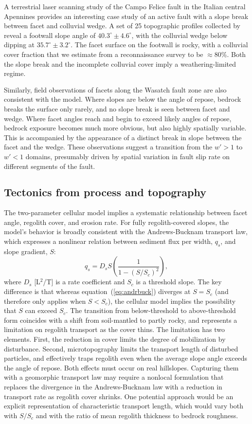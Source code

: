 A terrestrial laser scanning study of the Campo Felice fault in the Italian central Apennines provides an interesting case study of an active fault with a slope break between facet and colluvial wedge. A set of 25 topographic profiles collected by \citet{wilkinson2015slip} reveal a footwall slope angle of $40.3^\circ\pm 4.6^\circ$, with the colluvial wedge below dipping at $35.7^\circ\pm3.2^\circ$. The facet surface on the footwall is rocky, with a colluvial cover fraction that we estimate from a reconnaissance survey to be $\approx 80$\%. Both the slope break and the incomplete colluvial cover imply a weathering-limited regime. 

Similarly, field observations of facets along the Wasatch fault zone are also consistent with the model. Where slopes are below the angle of repose, bedrock breaks the surface only rarely, and no slope break is seen between facet and wedge. Where facet angles reach and begin to exceed likely angles of repose, bedrock exposure becomes much more obvious, but also highly spatially variable. This is accompanied by the appearance of a distinct break in slope between the facet and the wedge. These observations suggest a transition from the $w' > 1$ to $w' < 1$ domains, presumably driven by spatial variation in fault slip rate on different segments of the fault.

\subsection{Tectonics from process and topography}

The two-parameter cellular model implies a systematic relationship between facet angle, regolith cover, and erosion rate. For fully regolith-covered slopes, the model's behavior is broadly consistent with the Andrews-Bucknam transport law, which expresses a nonlinear relation between sediment flux per width, $q_s$, and slope gradient, $S$:
\begin{equation}
q_s = D_s S \left( \frac{1}{1-(S/S_c)^2} \right),
\label{eq:andrbuck}
\end{equation}
where $D_s$ [L$^2$/T] is a rate coefficient and $S_c$ is a threshold slope. The key difference is that whereas equation~(\ref{eq:andrbuck}) diverges at $S=S_c$ (and therefore only applies when $S<S_c$), the cellular model implies the possibility that $S$ can exceed $S_c$. The transition from below-threshold to above-threshold form coincides with a shift from soil-mantled to partly rocky, and represents a limitation on regolith transport as the cover thins. The limitation has two elements. First, the reduction in cover limits the degree of mobilization by disturbance. Second, microtopography limits the transport length of disturbed particles, and effectively traps regolith even when the average slope angle exceeds the angle of repose. Both effects must occur on real hillslopes. Capturing them with a geomorphic transport law may require a nonlocal formulation that replaces the divergence in the Andrews-Bucknam law with a reduction in transport rate as regolith cover shrinks. One potential approach would be an explicit representation of characteristic transport length, which would vary both with $S/S_c$ and with the ratio of mean regolith thickness to bedrock roughness.

